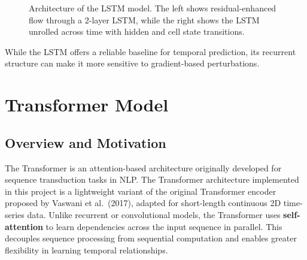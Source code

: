 \begin{figure}[H]
    \caption{Architecture of the LSTM model. The left shows residual-enhanced flow through a 2-layer LSTM, while the right shows the LSTM unrolled across time with hidden and cell state transitions.}
    \label{fig:lstm_architecture_final}
\end{figure}


While the LSTM offers a reliable baseline for temporal prediction, its recurrent structure can make it more sensitive to gradient-based perturbations.

\section{Transformer Model}

\subsection*{Overview and Motivation}
The Transformer is an attention-based architecture originally developed for sequence transduction tasks in NLP. The Transformer architecture implemented in this project is a lightweight variant of the original Transformer encoder proposed by Vaswani et al.~(2017), adapted for short-length continuous 2D time-series data. Unlike recurrent or convolutional models, the Transformer uses \textbf{self-attention} to learn dependencies across the input sequence in parallel. This decouples sequence processing from sequential computation and enables greater flexibility in learning temporal relationships.

